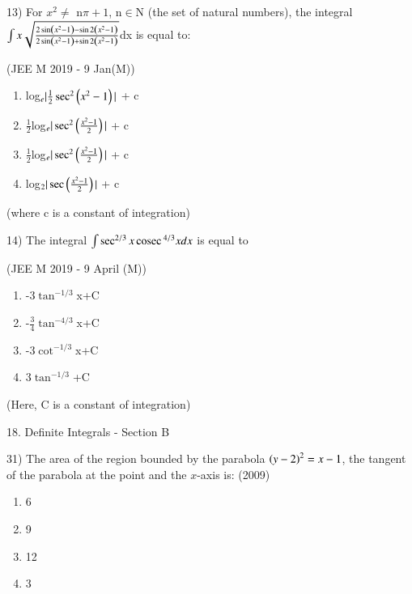\documentclass[journal,12pt,twocolumn]{IEEEtran}
\theoremstyle{remark}
\begin{document}
13)
	 For $x^2\neq$ n$\pi+1$, n$\in$N (the set of natural numbers), the integral $\int x\sqrt{\frac{2\sin \left(x^2-1\right)-\sin 2\left(x^2-1\right)}{2\sin \left(x^2-1\right)+\sin 2\left(x^2-1\right)}}$dx is equal to:

		\hfill{(JEE M 2019 - 9 Jan(M))}

		\begin{multicols}{1}
			\begin{enumerate}[label=(\alph*)]
				\item log$_e|\frac{1}{2}\sec ^2\left(x^2-1\right)|$ + c
				\item $\frac{1}{2}$log$_e|\sec ^2\left(\frac{x^2-1}{2}\right)|$ + c
				\item $\frac{1}{2}$log$_e|\sec ^2\left(\frac{x^2-1}{2}\right)|$ + c
				\item log$_2|\sec \left(\frac{x^2-1}{2}\right)|$ + c
			\end{enumerate}
		\end{multicols}
		(where c is a constant of integration)

14)
	 The integral $\int \sec ^{2/3}x\,\text{cosec}\, ^{4/3}x dx$ is equal to

		\hfill{(JEE M 2019 - 9 April (M))}

		\begin{multicols}{2}
			\begin{enumerate}[label=(\alph*)]
				\item -3$\tan ^{-1/3}$x+C
				\item -$\frac{3}{4}\tan ^{-4/3}$x+C
				\item -3$\cot ^{-1/3}$x+C
				\item 3$\tan ^{-1/3}$+C
			\end{enumerate}
		\end{multicols}
		(Here, C is a constant of integration)

18. Definite Integrals - Section B

31)
	 The area of the region bounded by the parabola $\left(y-2\right)^2=x-1$, the tangent of the parabola at the point  and the $x$-axis is:
		\hfill{(2009)}

		\begin{multicols}{4}
			\begin{enumerate}[label=(\alph*)]
				\item 6
				\item 9
				\item 12
				\item 3
			\end{enumerate}
		\end{multicols}
\end{document}
